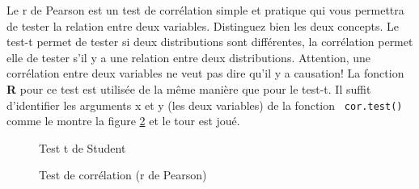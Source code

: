 \documentclass[10.5pt,a4paper]{article}
\newcommand{\rcode}[1]{\texttt{\color{rstudio} #1}}
\begin{document}
  Le r de Pearson est un test de corrélation simple et pratique qui vous permettra de tester la relation entre deux variables. Distinguez bien les deux concepts. Le test-t permet de tester si deux distributions sont différentes, la corrélation permet elle de tester s'il y a une relation entre deux distributions. Attention, une corrélation entre deux variables ne veut pas dire qu'il y a causation! La fonction \textbf{R} pour ce test est utilis\'ee de la même manière que pour le test-t. Il suffit d'identifier les arguments x et y (les deux variables) de la fonction \rcode{cor.test()} comme le montre la figure \ref{anaPearCorr} et le tour est joué.
  
  \begin{figure}[H]
    \centering
    \caption{Test t de Student}
    \label{anaTtest}
    \end{figure}
    
    \begin{figure}[H]
    \centering
    \caption{Test de corrélation (r de Pearson)}
    \label{anaPearCorr}
    \end{figure}
  
\end{document}
